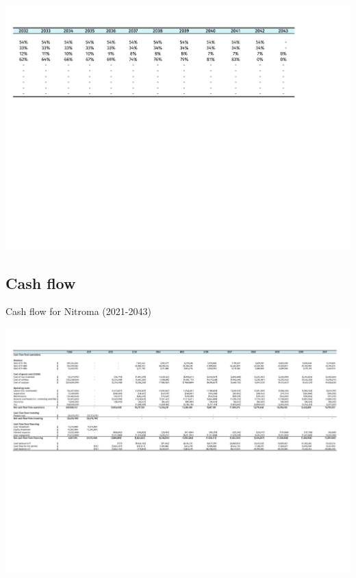 \begin{landscape}
\begin{table}
\includegraphics[clip, trim=0cm 5cm 0cm 0cm, width=\linewidth]{chapters/Z-support/attachments/KPI2.pdf}
\end{table}

\subsection{Cash flow}
\begin{table}
\label{tab:CashFlow}
  \caption{Cash flow for Nitroma (2021-2043)}
\includegraphics[clip, trim=0cm 5cm 0cm 0cm, width=\linewidth]{chapters/Z-support/attachments/Cash1.pdf}
\end{table}


\end{landscape}
